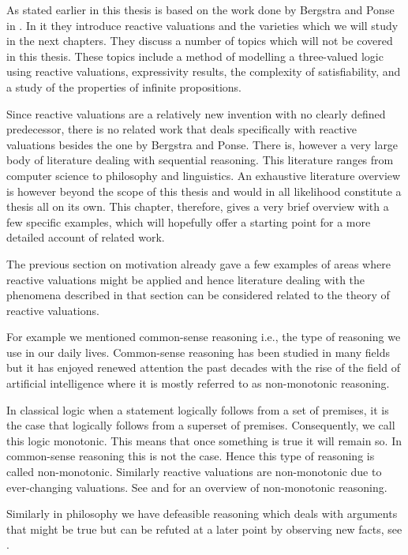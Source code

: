 \documentclass[a4paper,twoside,openright]{report}
\begin{document}
As stated earlier in this thesis is based on the work done by Bergstra and Ponse in \cite{main}. In it they introduce reactive valuations and the varieties which we will study in the next chapters. They discuss a number of topics which will not be covered in this thesis. These topics include a method of modelling a three-valued logic using reactive valuations, expressivity results, the complexity of satisfiability, and a study of the properties of infinite propositions.

Since reactive valuations are a relatively new invention with no clearly defined predecessor, there is no related work that deals specifically with reactive valuations besides the one by Bergstra and Ponse. There is, however a very large body of literature dealing with sequential reasoning. This literature ranges from computer science to philosophy and linguistics. An exhaustive literature overview is however beyond the scope of this thesis and would in all likelihood constitute a thesis all on its own. This chapter, therefore, gives a very brief overview with a few specific examples, which will hopefully offer a starting point for a more detailed account of related work.

The previous section on motivation already gave a few examples of areas where reactive valuations might be applied and hence literature dealing with the phenomena described in that section can be considered related to the theory of reactive valuations.

For example we mentioned common-sense reasoning i.e., the type of reasoning we use in our daily lives. Common-sense reasoning has been studied in many fields but it has enjoyed renewed attention the past decades with the rise of the field of artificial intelligence where it is mostly referred to as non-monotonic reasoning.

In classical logic when a statement  logically follows from a set  of premises, it is the case that  logically follows from a superset  of premises. Consequently, we call this logic monotonic. This means that once something is true it will remain so. In common-sense reasoning this is not the case. Hence this type of reasoning is called non-monotonic. Similarly reactive valuations are non-monotonic due to ever-changing valuations. See \cite{non-monotonic} and \cite{non-monotonic2} for an overview of non-monotonic reasoning.

Similarly in philosophy we have defeasible reasoning which deals with arguments that might be true but can be refuted at a later point by observing new facts, see \cite{defeasible}.
\end{document}

